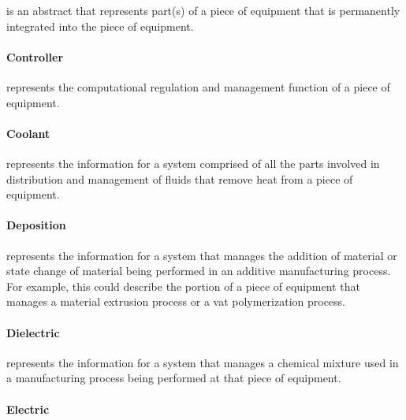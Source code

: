  is an abstract  that represents part(s) of a piece of equipment that is permanently integrated into the piece of equipment.



\paragraph{Controller}\mbox{}
\label{sec:Controller}


 represents the computational regulation and management function of a piece of equipment.



\paragraph{Coolant}\mbox{}
\label{sec:Coolant}


 represents the information for a system comprised of all the parts involved in distribution and management of fluids that remove heat from a piece of equipment.



\paragraph{Deposition}\mbox{}
\label{sec:Deposition}


 represents the information for a system that manages the addition of material or state change of material being performed in an additive manufacturing process.  For example, this could describe the portion of a piece of equipment that manages a material extrusion process or a vat polymerization process.



\paragraph{Dielectric}\mbox{}
\label{sec:Dielectric}


 represents the information for a system that manages a chemical mixture used in a manufacturing process being performed at that piece of equipment.



\paragraph{Electric}\mbox{}
\label{sec:Electric}



